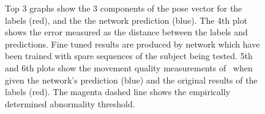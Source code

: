 \documentclass[11pt]{article} %
\begin{document}
\begin{figure}
\ContinuedFloat
\centering
%
\qquad%
%
\caption{Top 3 graphs show the 3 components of the pose vector for the labels (red), and the the network prediction (blue). The 4th plot shows the error measured as the distance between the labels and predictions. Fine tuned results are produced by network which have been trained with spare sequences of the subject being tested. 5th and 6th plots show the movement quality measurements of~\cite{Paiement} when given the network's prediction (blue) and the original results of the labels (red). The magenta dashed line shows the empirically determined abnormality threshold. }
\label{fig:s7-12}
\end{figure}
\end{document}
